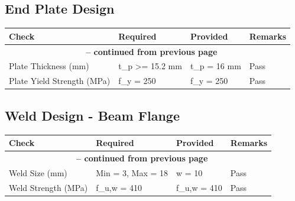\documentclass[12pt]{article}
\begin{document}
\subsection{End Plate Design}

\begin{longtable}{llll}
\cellcolor{OsdagGreen} Check & \cellcolor{OsdagGreen} Required & \cellcolor{OsdagGreen} Provided & \cellcolor{OsdagGreen} Remarks \\ \hline
\endfirsthead
\multicolumn{4}{c}{{\bfseries \tablename\ \thetable{} -- continued from previous page}} \\
\endhead
\endfoot
\endlastfoot
Plate Thickness (mm) & t\_p >= 15.2 mm & t\_p = 16 mm & Pass \\
\hline
Plate Yield Strength (MPa) & f\_y = 250 & f\_y = 250 & Pass \\
\hline
\end{longtable}

\subsection{Weld Design - Beam Flange}

\begin{longtable}{llll}
\cellcolor{OsdagGreen} Check & \cellcolor{OsdagGreen} Required & \cellcolor{OsdagGreen} Provided & \cellcolor{OsdagGreen} Remarks \\ \hline
\endfirsthead
\multicolumn{4}{c}{{\bfseries \tablename\ \thetable{} -- continued from previous page}} \\
\endhead
\endfoot
\endlastfoot
Weld Size (mm) & Min = 3, Max = 18 & w = 10 & Pass \\
\hline
Weld Strength (MPa) & f\_u,w = 410 & f\_u,w = 410 & Pass \\
\hline
\end{longtable}
\end{document}
